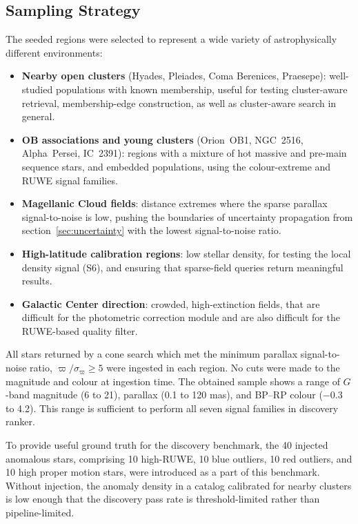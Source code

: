 \documentclass[preprint,12pt,authoryear]{elsarticle}
\newcommand{\parallax}{\varpi}
\begin{document}
\subsection{Sampling Strategy}
\label{sec:sampling}

The \nClusterNodes{} seeded regions were selected to represent a wide variety of astrophysically different environments:

\begin{itemize}
    \item \textbf{Nearby open clusters} (Hyades, Pleiades, Coma Berenices, Praesepe): well-studied populations with known membership, useful for testing cluster-aware retrieval, membership-edge construction, as well as cluster-aware search in general.
    \item \textbf{OB associations and young clusters} (Orion~OB1, NGC~2516, Alpha~Persei, IC~2391): regions with a mixture of hot massive and pre-main sequence stars, and embedded populations, using the colour-extreme and RUWE signal families.
    \item \textbf{Magellanic Cloud fields}: distance extremes where the sparse parallax signal-to-noise is low, pushing the boundaries of uncertainty propagation from section~\ref{sec:uncertainty} with the lowest signal-to-noise ratio.

    \item \textbf{High-latitude calibration regions}: low stellar density, for testing the local density signal (S6), and ensuring that sparse-field queries return meaningful results.
    \item \textbf{Galactic Center direction}: crowded, high-extinction fields, that are difficult for the photometric correction module and are also difficult for the RUWE-based quality filter.
\end{itemize}

All stars returned by a cone search which met the minimum parallax signal-to-noise ratio, $\parallax / \sigma_\parallax \ge 5$ were ingested in each region. No cuts were made to the magnitude and colour at ingestion time. The obtained sample shows a range of $G$-band magnitude (6 to 21), parallax (0.1 to 120 mas), and BP--RP colour ($-0.3$ to 4.2). This range is sufficient to perform all seven signal families in discovery ranker.

To provide useful ground truth for the discovery benchmark, the 40 injected anomalous stars, comprising 10 high-RUWE, 10 blue outliers, 10 red outliers, and 10 high proper motion stars, were introduced as a part of this benchmark. Without injection, the anomaly density in a catalog calibrated for nearby clusters is low enough that the discovery pass rate is threshold-limited rather than pipeline-limited.
\end{document}
